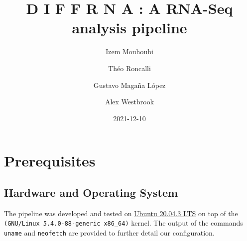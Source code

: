 \documentclass[
  openany]{book}
\title{D I F F R N A : A RNA-Seq analysis pipeline}
\author{Izem Mouhoubi \and Théo Roncalli \and Gustavo Magaña López \and Alex Westbrook}
\date{2021-12-10}
\begin{document}
\maketitle

{
\setcounter{tocdepth}{1}
\tableofcontents
}
\hypertarget{prerequisites}{%
\chapter{Prerequisites}\label{prerequisites}}

\hypertarget{hardware-and-operating-system}{%
\section{Hardware and Operating System}\label{hardware-and-operating-system}}

The pipeline was developed and tested on \href{https://fridge.ubuntu.com/2021/08/27/ubuntu-20-04-3-lts-released/}{Ubuntu 20.04.3 LTS}
on top of the \texttt{(GNU/Linux\ 5.4.0-88-generic\ x86\_64)} kernel. The output of the commands \texttt{uname} and \texttt{neofetch} are provided to further detail our configuration.
\end{document}
